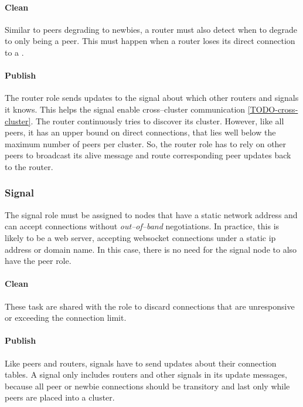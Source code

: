 \paragraph{Clean}
\begin{itemize}
     Similar to peers degrading to newbies, a router must also detect when to degrade to only being a peer. This must happen when a router loses its direct connection to a \signalRole.
\end{itemize}

\paragraph{Publish}
\begin{itemize}
     The router role sends updates to the signal about which other routers and signals it knows. This helps the signal enable cross–cluster communication \ref{TODO-cross-cluster}.
     The router continuously tries to discover its cluster. However, like all peers, it has an upper bound on direct connections, that lies well below the maximum number of peers per cluster. So, the router role has to rely on other peers to broadcast its alive message and route corresponding peer updates back to the router.
\end{itemize}

\subsubsection{Signal}
The signal role must be assigned to nodes that have a static network address and can accept connections without \textit{out–of–band} negotiations. In practice, this is likely to be a web server, accepting \gls{websocket} connections under a static \gls{ip} address or domain name. In this case, there is no need for the signal node to also have the peer role.

\paragraph{Clean}
\begin{itemize}
     These task are shared with the \peerRole role to discard connections that are unresponsive or exceeding the connection limit.
\end{itemize}

\paragraph{Publish}
\begin{itemize}
     Like peers and routers, signals have to send updates about their connection tables. A signal only includes routers and other signals in its update messages, because all peer or newbie connections should be transitory and last only while peers are placed into a cluster.
\end{itemize}


